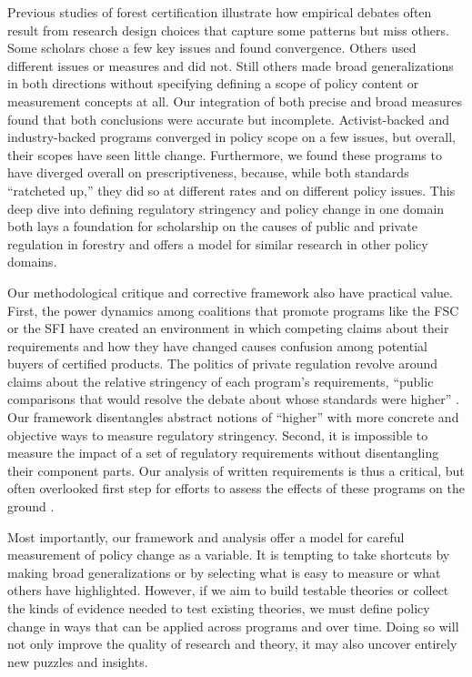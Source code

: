 \documentclass[
      12pt,
            Review ]{article}
\begin{document}
Previous studies of forest certification illustrate how empirical debates often result from research design choices that capture some patterns but miss others. Some scholars chose a few key issues and found convergence. Others used different issues or measures and did not. Still others made broad generalizations in both directions without specifying defining a scope of policy content or measurement concepts at all. Our integration of both precise and broad measures found that both conclusions were accurate but incomplete. Activist-backed and industry-backed programs converged in policy scope on a few issues, but overall, their scopes have seen little change. Furthermore, we found these programs to have diverged overall on prescriptiveness, because, while both standards ``ratcheted up,'' they did so at different rates and on different policy issues. This deep dive into defining regulatory stringency and policy change in one domain both lays a foundation for scholarship on the causes of public and private regulation in forestry and offers a model for similar research in other policy domains.

Our methodological critique and corrective framework also have practical value. First, the power dynamics among coalitions that promote programs like the FSC or the SFI have created an environment in which competing claims about their requirements and how they have changed causes confusion among potential buyers of certified products. The politics of private regulation revolve around claims about the relative stringency of each program's requirements, ``public comparisons that would resolve the debate about whose standards were higher'' \citep{Overdevest2010}. Our framework disentangles abstract notions of ``higher'' with more concrete and objective ways to measure regulatory stringency. Second, it is impossible to measure the impact of a set of regulatory requirements without disentangling their component parts. Our analysis of written requirements is thus a critical, but often overlooked first step for efforts to assess the effects of these programs on the ground \citep{VanderVen2018}.

Most importantly, our framework and analysis offer a model for careful measurement of policy change as a variable. It is tempting to take shortcuts by making broad generalizations or by selecting what is easy to measure or what others have highlighted. However, if we aim to build testable theories or collect the kinds of evidence needed to test existing theories, we must define policy change in ways that can be applied across programs and over time. Doing so will not only improve the quality of research and theory, it may also uncover entirely new puzzles and insights.
  \newpage 
  \theendnotes
\newpage
\singlespacing 
           
  
\end{document}
